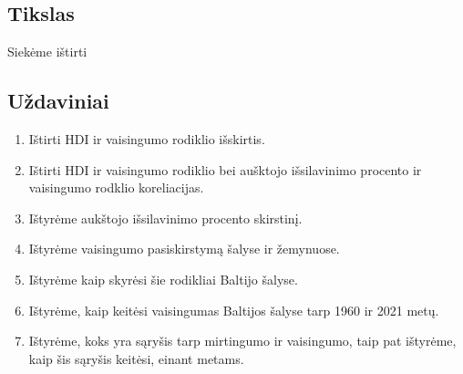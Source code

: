 \subsection{Tikslas} 
Siekėme ištirti 

\subsection{Uždaviniai}
\begin{enumerate}
    \item Ištirti HDI ir vaisingumo rodiklio išskirtis.
    \item Ištirti HDI ir vaisingumo rodiklio bei aušktojo išsilavinimo procento ir vaisingumo rodklio koreliacijas.
    \item Ištyrėme aukštojo išsilavinimo procento skirstinį.
    \item Ištyrėme vaisingumo pasiskirstymą šalyse ir žemynuose.
    \item Ištyrėme kaip skyrėsi šie rodikliai Baltijo šalyse.
    \item Ištyrėme, kaip keitėsi vaisingumas Baltijos šalyse tarp 1960 ir 2021 metų.
    \item Ištyrėme, koks yra sąryšis tarp mirtingumo ir vaisingumo, taip pat ištyrėme, kaip šis sąryšis keitėsi, einant metams.
\end{enumerate}